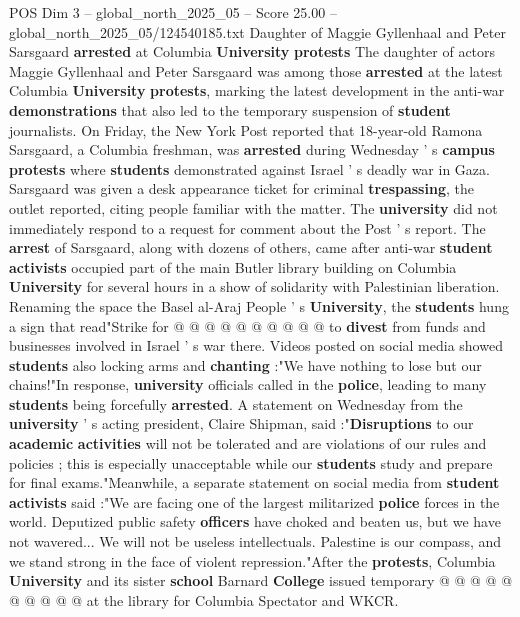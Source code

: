 \begin{textsample}{POS Dim 3 – global\_north\_2025\_05 – Score 25.00 – global\_north\_2025\_05/124540185.txt}  \label{ex:f3_pos_138}
Daughter of Maggie Gyllenhaal and Peter Sarsgaard \textbf{arrested} at Columbia \textbf{University} \textbf{protests} The daughter of actors Maggie Gyllenhaal and Peter Sarsgaard was among those \textbf{arrested} at the latest Columbia \textbf{University} \textbf{protests}, marking the latest development in the anti-war \textbf{demonstrations} that also led to the temporary suspension of \textbf{student} journalists.
On Friday, the New York Post reported that 18-year-old Ramona Sarsgaard, a Columbia freshman, was \textbf{arrested} during Wednesday ' s \textbf{campus} \textbf{protests} where \textbf{students} demonstrated against Israel ' s deadly war in Gaza.
Sarsgaard was given a desk appearance ticket for criminal \textbf{trespassing}, the outlet reported, citing people familiar with the matter.
The \textbf{university} did not immediately respond to a request for comment about the Post ' s report.
The \textbf{arrest} of Sarsgaard, along with dozens of others, came after anti-war \textbf{student} \textbf{activists} occupied part of the main Butler library building on Columbia \textbf{University} for several hours in a show of solidarity with Palestinian liberation.
Renaming the space the Basel al-Araj People ' s \textbf{University}, the \textbf{students} hung a sign that read"Strike for @ @ @ @ @ @ @ @ @ @ to \textbf{divest} from funds and businesses involved in Israel ' s war there.
Videos posted on social media showed \textbf{students} also locking arms and \textbf{chanting} :"We have nothing to lose but our chains!"In response, \textbf{university} officials called in the \textbf{police}, leading to many \textbf{students} being forcefully \textbf{arrested}.
A statement on Wednesday from the \textbf{university} ' s acting president, Claire Shipman, said :"\textbf{Disruptions} to our \textbf{academic} \textbf{activities} will not be tolerated and are violations of our rules and policies ; this is especially unacceptable while our \textbf{students} study and prepare for final exams."Meanwhile, a separate statement on social media from \textbf{student} \textbf{activists} said :"We are facing one of the largest militarized \textbf{police} forces in the world.
Deputized public safety \textbf{officers} have choked and beaten us, but we have not wavered...
We will not be useless intellectuals.
Palestine is our compass, and we stand strong in the face of violent repression."After the \textbf{protests}, Columbia \textbf{University} and its sister \textbf{school} Barnard \textbf{College} issued temporary @ @ @ @ @ @ @ @ @ @ at the library for Columbia Spectator and WKCR.

\end{textsample}
